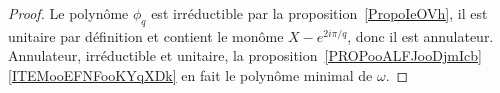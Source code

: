 \begin{proof}
    Le polynôme \( \phi_q\) est irréductible par la proposition~\ref{PropoIeOVh}, il est unitaire par définition et contient le monôme \( X- e^{2i\pi/q}\), donc il est annulateur. Annulateur, irréductible et unitaire, la proposition~\ref{PROPooALFJooDjmIcb}\ref{ITEMooEFNFooKYqXDk} en fait le polynôme minimal de \( \omega\).
\end{proof}

%
